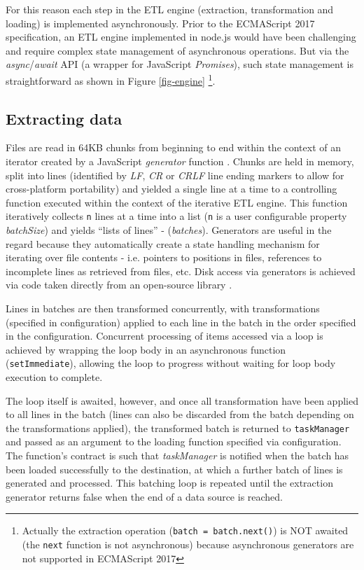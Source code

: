 For this reason each step in the ETL engine (extraction, transformation and loading) is implemented asynchronously. Prior to the ECMAScript 2017 specification, an ETL engine implemented in node.js would have been challenging and require complex state management of asynchronous operations. But via the \textit{async}/\textit{await} API (a wrapper for JavaScript \textit{Promises}), such state management is straightforward as shown in Figure \ref{fig-engine} \footnote{Actually the extraction operation (\texttt{batch = batch.next()}) is NOT awaited (the \texttt{next} function is not asynchronous) because asynchronous generators are not supported in ECMAScript 2017}.



\subsection{Extracting data}
Files are read in 64KB chunks from beginning to end within the context of an iterator created by a JavaScript \textit{generator} function \cite{mozillaGenerators}. Chunks are held in memory, split into lines (identified by \textit{LF}, \textit{CR} or \textit{CRLF} line ending markers to allow for cross-platform portability) and yielded a single line at a time to a controlling function executed within the context of the iterative ETL engine. This function iteratively collects \texttt{n} lines at a time into a list (\texttt{n} is a user configurable property \textit{batchSize}) and yields ``lists of lines'' - (\textit{batches}). Generators are useful in the regard because they automatically create a state handling mechanism for iterating over file contents - i.e. pointers to positions in files, references to incomplete lines as retrieved from files, etc. Disk access via generators is achieved via code taken directly from an open-source library \cite{bower16}.

Lines in batches are then transformed concurrently, with transformations (specified in configuration) applied to each line in the batch in the order specified in the configuration. Concurrent processing of items accessed via a loop is achieved by wrapping the loop body in an asynchronous function (\texttt{setImmediate}), allowing the loop to progress without waiting for loop body execution to complete.

The loop itself is awaited, however, and once all transformation have been applied to all lines in the batch (lines can also be discarded from the batch depending on the transformations applied), the transformed batch is returned to \texttt{taskManager} and passed as an argument to the loading function specified via configuration. The function's contract is such that \textit{taskManager} is notified when the batch has been loaded successfully to the destination, at which a further batch of lines is generated and processed. This batching loop is repeated until the extraction generator returns false when the end of a data source is reached.

